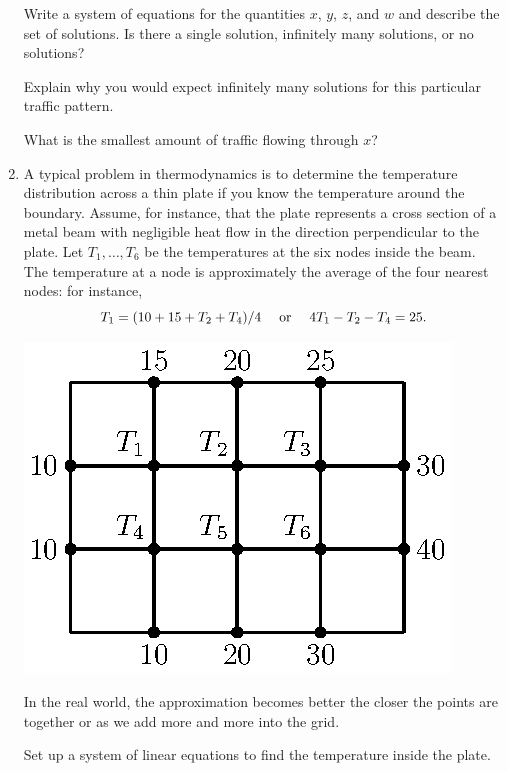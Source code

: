 \documentclass[12pt]{article}
\newcommand{\vs}[1]{\vspace{#1in}}
\begin{document}
\begin{enumerate}
    Write a system of equations for 
    the quantities $x$, $y$, $z$, and $w$
    and describe the set of solutions.  Is there a single solution,
    infinitely many solutions, or no solutions?


    \vs{2}

    Explain why you would expect infinitely many solutions for this
    particular traffic pattern. 

    \vs{1.5}
    What is the smallest amount of traffic flowing through
    $x$?

    \vs{1}
    \newpage
\item A typical problem in thermodynamics is to determine the
  temperature distribution across a thin plate if you know the
  temperature around the boundary.  Assume, for instance, that the
  plate represents a cross section of a metal beam with negligible
  heat flow in the direction perpendicular to the plate.  Let $T_1,
  \ldots, T_6$ be the temperatures at the six nodes inside the beam.
  The temperature at a node is approximately the average of the four
  nearest nodes: for instance,
  $$ T_1 = (10 + 15 + T_2 + T_4)/4 ~~~\hbox{ or } ~~~4T_1 - T_2 - T_4 =
  25.$$
  
  \begin{center}
    \includegraphics{heat.eps}
  \end{center}
  
  In the real world, the approximation becomes better the closer the
  points are together or as we add more and more into the grid.
  
  Set up a system of linear equations to find the temperature inside
  the plate.
  
  \vs{2}
  

\end{enumerate}
\end{document}
